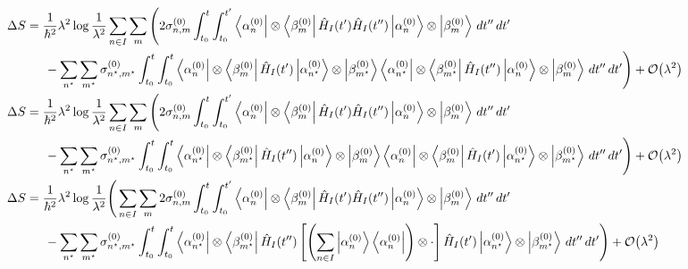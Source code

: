 \documentclass[11pt]{article}
\newcommand{\Od}[1]{\mathcal{O}{\left(#1\right)}}
\newcommand{\bra}[1]{\left\langle#1\right|}
\newcommand{\ket}[1]{\left|#1\right\rangle}
\newcommand{\op}[1]{\hat{#1}}
\theoremstyle{theorem}
\theoremstyle{remark}
\theoremstyle{step}
\theoremstyle{gap}
\begin{document}
\begin{align*}
&\hspace{-4em}\Delta S =\frac{1}{\hbar^2}\lambda^2 \log\frac{1}{\lambda^2}\sum_{n \in I}\sum_m \Bigg(2 \sigma_{n,m}^{(0)} \int_{t_0}^t \int_{t_0}^{t^\prime} \bra{\alpha_n^{(0)}}\otimes\bra{\beta_m^{(0)}}\op{H}_I (t^\prime) \op{H}_I(t^{\prime\prime}) \ket{\alpha_n^{(0)}}\otimes\ket{\beta_m^{(0)}}\,dt^{\prime\prime}\,dt^\prime \\
&\hspace{-1em}-\sum_{n^\star} \sum_{m^\star} \sigma_{n^\star,m^\star}^{(0)}\int_{t_0}^t \int_{t_0}^{t} \bra{\alpha_n^{(0)}}\otimes\bra{\beta_m^{(0)}}\op{H}_I (t^\prime) \ket{\alpha_{n^\star}^{(0)}}\otimes\ket{\beta_{m^\star}^{(0)}}\bra{\alpha_{n^\star}^{(0)}}\otimes\bra{\beta_{m^\star}^{(0)}} \op{H}_I (t^{\prime\prime})\ket{\alpha_n^{(0)}}\otimes\ket{\beta_m^{(0)}}\,dt^{\prime\prime}\,dt^\prime \Bigg) + \Od{\lambda^2}\\
&\hspace{-4em}\Delta S =\frac{1}{\hbar^2}\lambda^2 \log\frac{1}{\lambda^2}\sum_{n \in I}\sum_m \Bigg(2 \sigma_{n,m}^{(0)} \int_{t_0}^t \int_{t_0}^{t^\prime} \bra{\alpha_n^{(0)}}\otimes\bra{\beta_m^{(0)}}\op{H}_I (t^\prime) \op{H}_I(t^{\prime\prime}) \ket{\alpha_n^{(0)}}\otimes\ket{\beta_m^{(0)}}\,dt^{\prime\prime}\,dt^\prime \\
&\hspace{-1em}-\sum_{n^\star} \sum_{m^\star} \sigma_{n^\star,m^\star}^{(0)}\int_{t_0}^t \int_{t_0}^{t} \bra{\alpha_{n^\star}^{(0)}}\otimes\bra{\beta_{m^\star}^{(0)}} \op{H}_I (t^{\prime\prime})\ket{\alpha_n^{(0)}}\otimes\ket{\beta_m^{(0)}} \bra{\alpha_n^{(0)}}\otimes\bra{\beta_m^{(0)}}\op{H}_I (t^\prime) \ket{\alpha_{n^\star}^{(0)}}\otimes\ket{\beta_{m^\star}^{(0)}}\,dt^{\prime\prime}\,dt^\prime \Bigg) + \Od{\lambda^2}\\
&\hspace{-4em}\Delta S =\frac{1}{\hbar^2}\lambda^2 \log\frac{1}{\lambda^2} \Bigg(\sum_{n \in I}\sum_m2 \sigma_{n,m}^{(0)} \int_{t_0}^t \int_{t_0}^{t^\prime} \bra{\alpha_n^{(0)}}\otimes\bra{\beta_m^{(0)}}\op{H}_I (t^\prime) \op{H}_I(t^{\prime\prime}) \ket{\alpha_n^{(0)}}\otimes\ket{\beta_m^{(0)}}\,dt^{\prime\prime}\,dt^\prime \\
&\hspace{-1em}-\sum_{n^\star} \sum_{m^\star} \sigma_{n^\star,m^\star}^{(0)}\int_{t_0}^t \int_{t_0}^{t} \bra{\alpha_{n^\star}^{(0)}}\otimes\bra{\beta_{m^\star}^{(0)}} \op{H}_I (t^{\prime\prime})\left[\left(\sum_{n\in I} \ket{\alpha_n^{(0)}}\bra{\alpha_n^{(0)}}\right)\otimes\cdot\right]\op{H}_I (t^\prime) \ket{\alpha_{n^\star}^{(0)}}\otimes\ket{\beta_{m^\star}^{(0)}}\,dt^{\prime\prime}\,dt^\prime \Bigg) + \Od{\lambda^2}\\

\end{align*}
\end{document}
